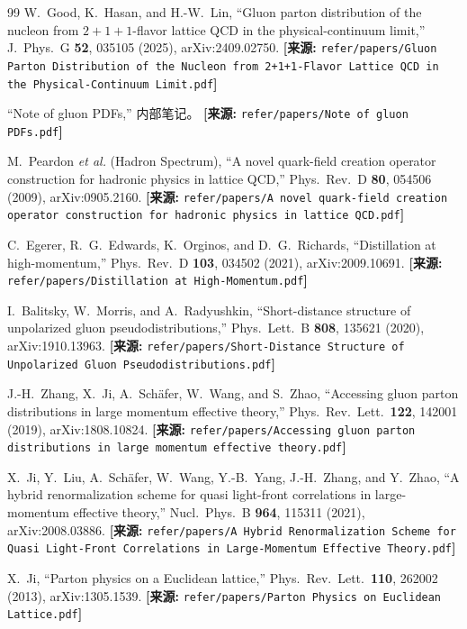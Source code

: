 \documentclass[12pt,a4paper]{ctexart}
\theoremstyle{definition}
\begin{document}
\begin{thebibliography}{99}
W.~Good, K.~Hasan, and H.-W.~Lin,
``Gluon parton distribution of the nucleon from $2+1+1$-flavor lattice QCD in the physical-continuum limit,''
J.\ Phys.\ G \textbf{52}, 035105 (2025), arXiv:2409.02750.
\quad\textbf{[来源:} \texttt{refer/papers/Gluon Parton Distribution of the Nucleon from 2+1+1-Flavor Lattice QCD in the Physical-Continuum Limit.pdf}\textbf{]}


``Note of gluon PDFs,''
内部笔记。
\quad\textbf{[来源:} \texttt{refer/papers/Note of gluon PDFs.pdf}\textbf{]}

M.~Peardon \textit{et al.} (Hadron Spectrum),
``A novel quark-field creation operator construction for hadronic physics in lattice QCD,''
Phys.\ Rev.\ D \textbf{80}, 054506 (2009), arXiv:0905.2160.
\quad\textbf{[来源:} \texttt{refer/papers/A novel quark-field creation operator construction for hadronic physics in lattice QCD.pdf}\textbf{]}

C.~Egerer, R.~G.~Edwards, K.~Orginos, and D.~G.~Richards,
``Distillation at high-momentum,''
Phys.\ Rev.\ D \textbf{103}, 034502 (2021), arXiv:2009.10691.
\quad\textbf{[来源:} \texttt{refer/papers/Distillation at High-Momentum.pdf}\textbf{]}

I.~Balitsky, W.~Morris, and A.~Radyushkin,
``Short-distance structure of unpolarized gluon pseudodistributions,''
Phys.\ Lett.\ B \textbf{808}, 135621 (2020), arXiv:1910.13963.
\quad\textbf{[来源:} \texttt{refer/papers/Short-Distance Structure of Unpolarized Gluon Pseudodistributions.pdf}\textbf{]}

J.-H.~Zhang, X.~Ji, A.~Sch\"afer, W.~Wang, and S.~Zhao,
``Accessing gluon parton distributions in large momentum effective theory,''
Phys.\ Rev.\ Lett.\ \textbf{122}, 142001 (2019), arXiv:1808.10824.
\quad\textbf{[来源:} \texttt{refer/papers/Accessing gluon parton distributions in large momentum effective theory.pdf}\textbf{]}

X.~Ji, Y.~Liu, A.~Sch\"afer, W.~Wang, Y.-B.~Yang, J.-H.~Zhang, and Y.~Zhao,
``A hybrid renormalization scheme for quasi light-front correlations in large-momentum effective theory,''
Nucl.\ Phys.\ B \textbf{964}, 115311 (2021), arXiv:2008.03886.
\quad\textbf{[来源:} \texttt{refer/papers/A Hybrid Renormalization Scheme for Quasi Light-Front Correlations in Large-Momentum Effective Theory.pdf}\textbf{]}

X.~Ji,
``Parton physics on a Euclidean lattice,''
Phys.\ Rev.\ Lett.\ \textbf{110}, 262002 (2013), arXiv:1305.1539.
\quad\textbf{[来源:} \texttt{refer/papers/Parton Physics on Euclidean Lattice.pdf}\textbf{]}


\end{thebibliography}
\end{document}
